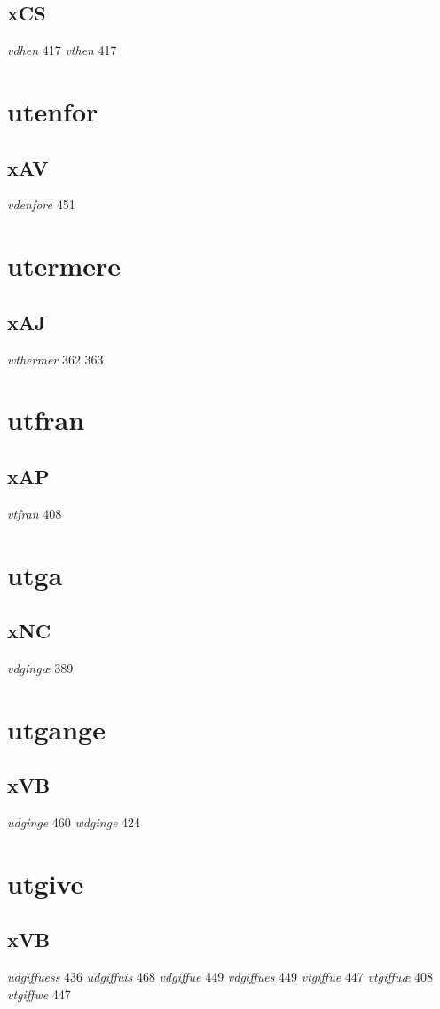 \documentclass[a4paper,twocolumn]{article}
\begin{document}
\subsection{xCS}
\label{sec:org18f2f9a}
\emph{vdhen} 417 \emph{vthen} 417 
\section{utenfor}
\label{sec:org06db72d}
\subsection{xAV}
\label{sec:org154ec00}
\emph{vdenfore} 451 
\section{utermere}
\label{sec:orge405c1a}
\subsection{xAJ}
\label{sec:org1bf558d}
\emph{wthermer} 362 363 
\section{utfran}
\label{sec:org6377117}
\subsection{xAP}
\label{sec:orgee05f89}
\emph{vtfran} 408 
\section{utga}
\label{sec:org21292fe}
\subsection{xNC}
\label{sec:orgf49ca5c}
\emph{vdgingæ} 389 
\section{utgange}
\label{sec:orga6a1f41}
\subsection{xVB}
\label{sec:org443a933}
\emph{udginge} 460 \emph{wdginge} 424 
\section{utgive}
\label{sec:orgb8ca5e7}
\subsection{xVB}
\label{sec:orgeb2a754}
\emph{udgiffuess} 436 \emph{udgiffuis} 468 \emph{vdgiffue} 449 \emph{vdgiffues} 449 \emph{vtgiffue} 447 \emph{vtgiffuæ} 408 \emph{vtgiffwe} 447 
\end{document}

